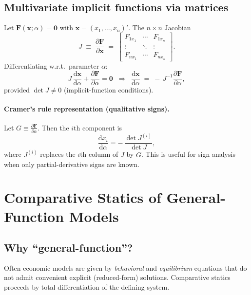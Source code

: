 \documentclass[11pt]{article}
\newcommand{\pd}[2]{\frac{\partial #1}{\partial #2}}
\newcommand{\dtotal}[2]{\frac{\mathrm{d} #1}{\mathrm{d} #2}}
\newcommand{\vect}[1]{\bm{#1}}
\begin{document}
\subsection*{Multivariate implicit functions via matrices}
Let $\vect{F}(\vect{x};\alpha)=\vect{0}$ with $\vect{x}=(x_1,\dots,x_n)'$. The $n\times n$ Jacobian
\[
J \;\equiv\; \pd{\vect{F}}{\vect{x}}
\;=\;
\begin{bmatrix}
F_{1x_1}&\cdots&F_{1x_n}\\
\vdots&\ddots&\vdots\\
F_{nx_1}&\cdots&F_{nx_n}
\end{bmatrix}.
\]
Differentiating w.r.t.\ parameter $\alpha$:
\[
J\,\dtotal{\vect{x}}{\alpha} + \pd{\vect{F}}{\alpha} = \vect{0}
\;\;\Rightarrow\;\;
\dtotal{\vect{x}}{\alpha} \;=\; -\,J^{-1}\pd{\vect{F}}{\alpha},
\]
provided $\det J\neq 0$ (implicit-function conditions).

\paragraph{Cramer's rule representation (qualitative signs).}
Let $G\equiv \pd{\vect{F}}{\alpha}$.
Then the $i$th component is
\[
\dtotal{x_i}{\alpha} = -\,\frac{\det J^{(i)}}{\det J},
\]
where $J^{(i)}$ replaces the $i$th column of $J$ by $G$. This is useful for sign analysis when only partial-derivative signs are known.

\section{Comparative Statics of General-Function Models}
\subsection*{Why ``general-function''?}
Often economic models are given by \emph{behavioral} and \emph{equilibrium} equations that do not admit convenient explicit (reduced-form) solutions. Comparative statics proceeds by total differentiation of the defining system.
\end{document}
